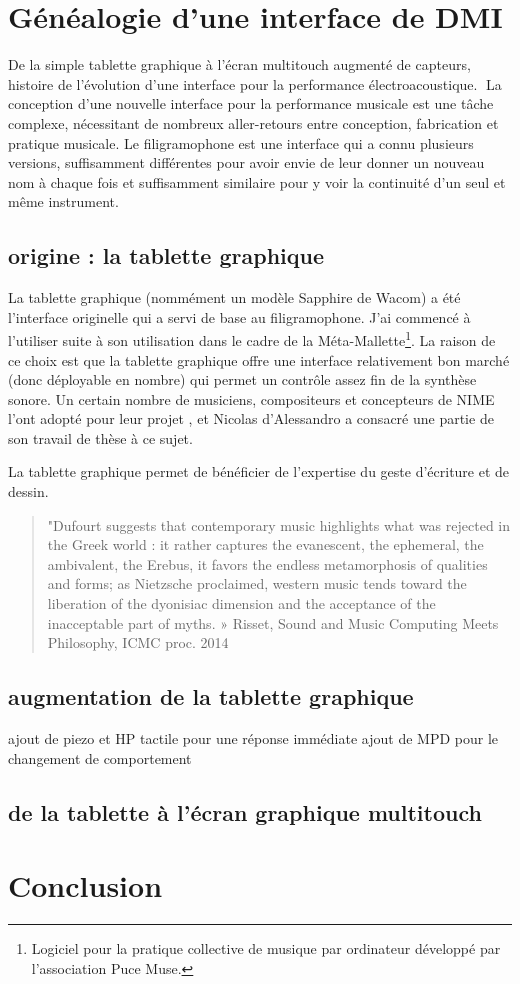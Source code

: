 \section{Généalogie d’une interface de DMI}
\label{sec:interfaces:sec1}

De la simple tablette graphique à l’écran multitouch augmenté de capteurs, histoire de l’évolution d’une interface pour la performance électroacoustique.
La conception d’une nouvelle interface pour la performance musicale est une tâche complexe, nécessitant de nombreux aller-retours entre conception, fabrication et pratique musicale. Le filigramophone est une interface qui a connu plusieurs versions, suffisamment différentes pour avoir envie de leur donner un nouveau nom à chaque fois et suffisamment similaire pour y voir la continuité d’un seul et même instrument.

\subsection{origine : la tablette graphique}
La tablette graphique (nommément un modèle Sapphire de Wacom) a été l’interface originelle qui a servi de base au filigramophone. J’ai commencé à l’utiliser suite à son utilisation dans le cadre de la Méta-Mallette\footnote{Logiciel pour la pratique collective de musique par ordinateur développé par l’association Puce Muse.}. La raison de ce choix est que la tablette graphique offre une interface relativement bon marché (donc déployable en nombre) qui permet un contrôle assez fin de la synthèse sonore.
Un certain nombre de musiciens, compositeurs et concepteurs de NIME l’ont adopté pour leur projet \cite{Zby07}, et Nicolas d’Alessandro a consacré une partie de son travail de thèse \cite{Ale09} à ce sujet.

La tablette graphique permet de bénéficier de l’expertise du geste d’écriture et de dessin.

\begin{quote}
"Dufourt suggests that contemporary music highlights what was rejected in the Greek world : it rather captures the evanescent, the ephemeral, the ambivalent, the Erebus, it favors the endless metamorphosis of qualities and forms; as Nietzsche proclaimed, western music tends toward the liberation of the dyonisiac dimension and the acceptance of the inacceptable part of myths. » Risset, Sound and Music Computing Meets Philosophy, ICMC proc. 2014
\end{quote}

\subsection{augmentation de la tablette graphique}
ajout de piezo et HP tactile pour une réponse immédiate
ajout de MPD pour le changement de comportement

\subsection{de la tablette à l'écran graphique multitouch}


\section{Conclusion}
\label{sec:interfaces:conclusion}
